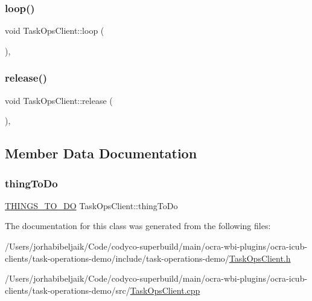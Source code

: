 \hypertarget{classTaskOpsClient_a7e7dfab7af0404f0b008da2844ab573e}{}\label{classTaskOpsClient_a7e7dfab7af0404f0b008da2844ab573e} 
\subsubsection{\texorpdfstring{loop()}{loop()}}
{\footnotesize\ttfamily void Task\+Ops\+Client\+::loop (\begin{DoxyParamCaption}{ }\end{DoxyParamCaption})\hspace{0.3cm}{\ttfamily [protected]}, {\ttfamily [virtual]}}

\hypertarget{classTaskOpsClient_af54d37bc4a2631c5c47e23d8156f6e95}{}\label{classTaskOpsClient_af54d37bc4a2631c5c47e23d8156f6e95} 
\subsubsection{\texorpdfstring{release()}{release()}}
{\footnotesize\ttfamily void Task\+Ops\+Client\+::release (\begin{DoxyParamCaption}{ }\end{DoxyParamCaption})\hspace{0.3cm}{\ttfamily [protected]}, {\ttfamily [virtual]}}



\subsection{Member Data Documentation}
\hypertarget{classTaskOpsClient_a3409c4ef6b396943397b5bd9237f0a40}{}\label{classTaskOpsClient_a3409c4ef6b396943397b5bd9237f0a40} 
\subsubsection{\texorpdfstring{thing\+To\+Do}{thingToDo}}
{\footnotesize\ttfamily \hyperlink{TaskOpsClient_8h_a0140057ae3fbe1db5f5c418dfc67d9db}{T\+H\+I\+N\+G\+S\+\_\+\+T\+O\+\_\+\+DO} Task\+Ops\+Client\+::thing\+To\+Do\hspace{0.3cm}{\ttfamily [private]}}



The documentation for this class was generated from the following files\+:\begin{DoxyCompactItemize}
\item 
/\+Users/jorhabibeljaik/\+Code/codyco-\/superbuild/main/ocra-\/wbi-\/plugins/ocra-\/icub-\/clients/task-\/operations-\/demo/include/task-\/operations-\/demo/\hyperlink{TaskOpsClient_8h}{Task\+Ops\+Client.\+h}\item 
/\+Users/jorhabibeljaik/\+Code/codyco-\/superbuild/main/ocra-\/wbi-\/plugins/ocra-\/icub-\/clients/task-\/operations-\/demo/src/\hyperlink{TaskOpsClient_8cpp}{Task\+Ops\+Client.\+cpp}\end{DoxyCompactItemize}
